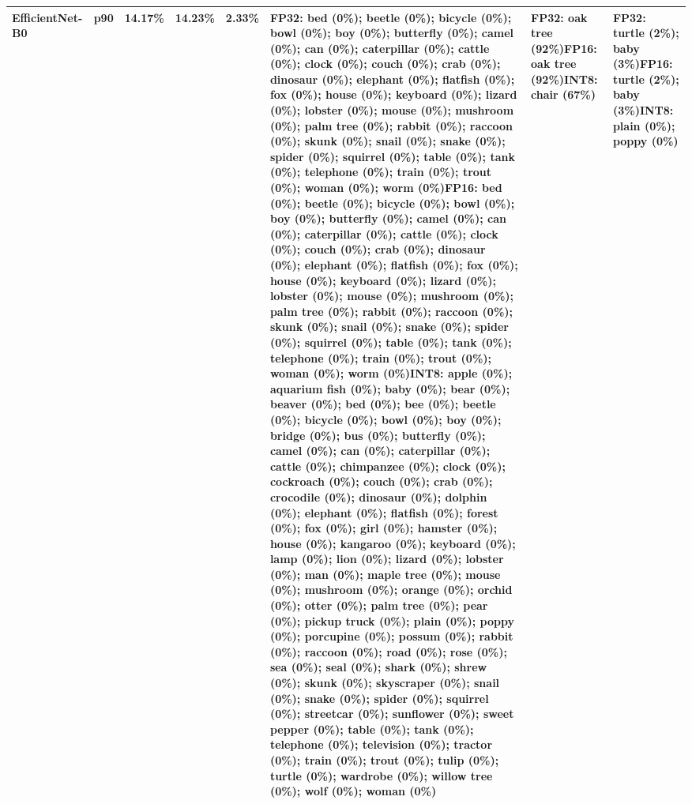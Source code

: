 \begin{longtable}{p{2.8cm} r r r r p{5.0cm} p{4.2cm} p{4.2cm}}
EfficientNet-B0 & p90 & 14.17\% & 14.23\% & 2.33\% & FP32: bed (0\%); beetle (0\%); bicycle (0\%); bowl (0\%); boy (0\%); butterfly (0\%); camel (0\%); can (0\%); caterpillar (0\%); cattle (0\%); clock (0\%); couch (0\%); crab (0\%); dinosaur (0\%); elephant (0\%); flatfish (0\%); fox (0\%); house (0\%); keyboard (0\%); lizard (0\%); lobster (0\%); mouse (0\%); mushroom (0\%); palm tree (0\%); rabbit (0\%); raccoon (0\%); skunk (0\%); snail (0\%); snake (0\%); spider (0\%); squirrel (0\%); table (0\%); tank (0\%); telephone (0\%); train (0\%); trout (0\%); woman (0\%); worm (0\%)\newline FP16: bed (0\%); beetle (0\%); bicycle (0\%); bowl (0\%); boy (0\%); butterfly (0\%); camel (0\%); can (0\%); caterpillar (0\%); cattle (0\%); clock (0\%); couch (0\%); crab (0\%); dinosaur (0\%); elephant (0\%); flatfish (0\%); fox (0\%); house (0\%); keyboard (0\%); lizard (0\%); lobster (0\%); mouse (0\%); mushroom (0\%); palm tree (0\%); rabbit (0\%); raccoon (0\%); skunk (0\%); snail (0\%); snake (0\%); spider (0\%); squirrel (0\%); table (0\%); tank (0\%); telephone (0\%); train (0\%); trout (0\%); woman (0\%); worm (0\%)\newline INT8: apple (0\%); aquarium fish (0\%); baby (0\%); bear (0\%); beaver (0\%); bed (0\%); bee (0\%); beetle (0\%); bicycle (0\%); bowl (0\%); boy (0\%); bridge (0\%); bus (0\%); butterfly (0\%); camel (0\%); can (0\%); caterpillar (0\%); cattle (0\%); chimpanzee (0\%); clock (0\%); cockroach (0\%); couch (0\%); crab (0\%); crocodile (0\%); dinosaur (0\%); dolphin (0\%); elephant (0\%); flatfish (0\%); forest (0\%); fox (0\%); girl (0\%); hamster (0\%); house (0\%); kangaroo (0\%); keyboard (0\%); lamp (0\%); lion (0\%); lizard (0\%); lobster (0\%); man (0\%); maple tree (0\%); mouse (0\%); mushroom (0\%); orange (0\%); orchid (0\%); otter (0\%); palm tree (0\%); pear (0\%); pickup truck (0\%); plain (0\%); poppy (0\%); porcupine (0\%); possum (0\%); rabbit (0\%); raccoon (0\%); road (0\%); rose (0\%); sea (0\%); seal (0\%); shark (0\%); shrew (0\%); skunk (0\%); skyscraper (0\%); snail (0\%); snake (0\%); spider (0\%); squirrel (0\%); streetcar (0\%); sunflower (0\%); sweet pepper (0\%); table (0\%); tank (0\%); telephone (0\%); television (0\%); tractor (0\%); train (0\%); trout (0\%); tulip (0\%); turtle (0\%); wardrobe (0\%); willow tree (0\%); wolf (0\%); woman (0\%) & FP32: oak tree (92\%)\newline FP16: oak tree (92\%)\newline INT8: chair (67\%) & FP32: turtle (2\%); baby (3\%)\newline FP16: turtle (2\%); baby (3\%)\newline INT8: plain (0\%); poppy (0\%) \\ \hline

\end{longtable}
